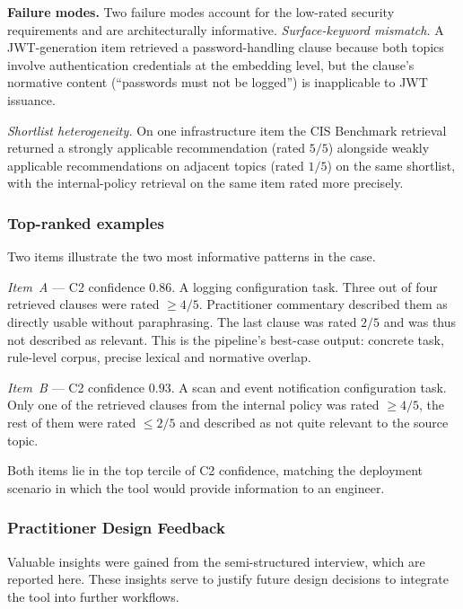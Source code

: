 \textbf{Failure modes.}
Two failure modes account for the low-rated security requirements and are architecturally informative.
\emph{Surface-keyword mismatch.} A JWT-generation item retrieved a password-handling clause because both topics involve authentication credentials at the embedding level, but the clause's normative content (``passwords must not be logged'') is inapplicable to JWT issuance.

\emph{Shortlist heterogeneity.} On one infrastructure item the CIS Benchmark retrieval returned a strongly applicable recommendation (rated $5/5$) alongside weakly applicable recommendations on adjacent topics (rated $1/5$) on the same shortlist, with the internal-policy retrieval on the same item rated more precisely.

\subsubsection*{Top-ranked examples}\label{sec:results-c3-examples}

Two items illustrate the two most informative patterns in the case.

\emph{Item~A} --- C2 confidence $0.86$. A logging configuration task. Three out of four retrieved clauses were rated $\geq 4/5$. Practitioner commentary described them as directly usable without paraphrasing. The last clause was rated $2/5$ and was thus not described as relevant. This is the pipeline's best-case output: concrete task, rule-level corpus, precise lexical and normative overlap.

\emph{Item~B} --- C2 confidence $0.93$. A scan and event notification configuration task. Only one of the retrieved clauses from the internal policy was rated $\geq 4/5$, the rest of them were rated $\leq 2/5$ and described as not quite relevant to the source topic.

Both items lie in the top tercile of C2 confidence, matching the deployment scenario in which the tool would provide information to an engineer.

\subsubsection*{Practitioner Design Feedback}\label{sec:results-c3-feedback}

Valuable insights were gained from the semi-structured interview, which are reported here. These insights serve to justify future design decisions to integrate the tool into further workflows.

